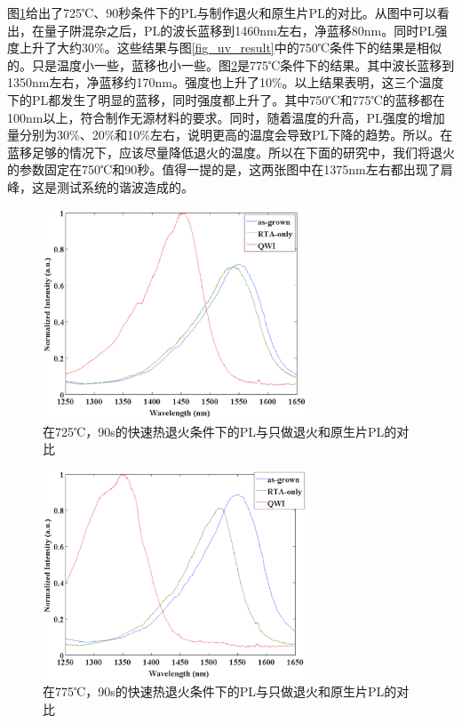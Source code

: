 \documentclass{ZJUthesis}
\begin{document}
图\ref{fig_qwi_725C}给出了725℃、90秒条件下的PL与制作退火和原生片PL的对比。从图中可以看出，在量子阱混杂之后，PL的波长蓝移到1460nm左右，净蓝移80nm。同时PL强度上升了大约30\%。这些结果与图\ref{fig_uv_result}中的750℃条件下的结果是相似的。只是温度小一些，蓝移也小一些。图\ref{fig_qwi_775C}是775℃条件下的结果。其中波长蓝移到1350nm左右，净蓝移约170nm。强度也上升了10\%。以上结果表明，这三个温度下的PL都发生了明显的蓝移，同时强度都上升了。其中750℃和775℃的蓝移都在100nm以上，符合制作无源材料的要求。同时，随着温度的升高，PL强度的增加量分别为30\%、20\%和10\%左右，说明更高的温度会导致PL下降的趋势。所以。在蓝移足够的情况下，应该尽量降低退火的温度。所以在下面的研究中，我们将退火的参数固定在750℃和90秒。值得一提的是，这两张图中在1375nm左右都出现了肩峰，这是测试系统的谐波造成的。

\begin{figure}[!t]
    \centering
    \includegraphics[width=0.7\textwidth]{./Pictures/qwi_725C.eps}
    \caption{在725℃，90s的快速热退火条件下的PL与只做退火和原生片PL的对比}
    \label{fig_qwi_725C}
\end{figure}

\begin{figure}[!t]
    \centering
    \includegraphics[width=0.7\textwidth]{./Pictures/qwi_775C.eps}
    \caption{在775℃，90s的快速热退火条件下的PL与只做退火和原生片PL的对比}
    \label{fig_qwi_775C}
\end{figure}
\end{document}
